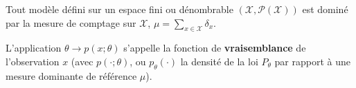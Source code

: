 \begin{rem}
	Tout modèle défini sur un espace fini ou dénombrable $(\mathcal{X}, \mathcal{P}(\mathcal{X}))$ est dominé par la mesure de comptage sur $\mathcal{X}$, $\mu = \sum_{x \in \mathcal{X}} \delta_x$.
\end{rem}

\begin{defn}
	L'application $\theta \to p(x ; \theta)$ s'appelle la fonction de \textbf{vraisemblance} de l'observation $x$ (avec $p(\cdot; \theta)$, ou $p_\theta(\cdot)$ la densité de la loi $P_\theta$ par rapport à une mesure dominante de référence $\mu$).
\end{defn}